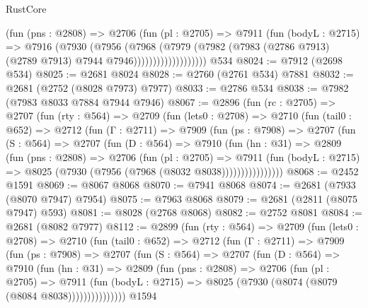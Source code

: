 \begin{lexlean}{RustCore}
\begin{coremodule}
                        (fun (pns : @2808) =>
                        @2706
                          (fun (pl : @2705) =>
                          @7911
                            (fun (bodyL : @2715) =>
                            @7916
                              (@7930
                                (@7956
                                  (@7968
                                    (@7979
                                      (@7982
                                        (@7983
                                          (@2786 @7913)
                                          (@2789 @7913)
                                          @7944
                                          @7946)))))))))))))))))))
    @534
@8024 := @7912 (@2698 @534)
@8025 := @2681 @8024
@8028 := @2760 (@2761 @534) @7881
@8032 := @2681 (@2752 (@8028 @7973) @7977)
@8033 := @2786 @534
@8038 := @7982 (@7983 @8033 @7884 @7944 @7946)
@8067 := @2896
    (fun (rc : @2705) =>
    @2707
      (fun (rty : @564) =>
      @2709
        (fun (lets0 : @2708) =>
        @2710
          (fun (tail0 : @652) =>
          @2712
            (fun (Γ : @2711) =>
            @7909
              (fun (ps : @7908) =>
              @2707
                (fun (S : @564) =>
                @2707
                  (fun (D : @564) =>
                  @7910
                    (fun (hn : @31) =>
                    @2809
                      (fun (pns : @2808) =>
                      @2706
                        (fun (pl : @2705) =>
                        @7911
                          (fun (bodyL : @2715) =>
                          @8025 (@7930 (@7956 (@7968 (@8032 @8038))))))))))))))))
@8068 := @2452 @1591
@8069 := @8067 @8068
@8070 := @7941 @8068
@8074 := @2681 (@7933 (@8070 @7947) @7954)
@8075 := @7963 @8068
@8079 := @2681 (@2811 (@8075 @7947) @593)
@8081 := @8028 (@2768 @8068)
@8082 := @2752 @8081
@8084 := @2681 (@8082 @7977)
@8112 := @2899
    (fun (rty : @564) =>
    @2709
      (fun (lets0 : @2708) =>
      @2710
        (fun (tail0 : @652) =>
        @2712
          (fun (Γ : @2711) =>
          @7909
            (fun (ps : @7908) =>
            @2707
              (fun (S : @564) =>
              @2707
                (fun (D : @564) =>
                @7910
                  (fun (hn : @31) =>
                  @2809
                    (fun (pns : @2808) =>
                    @2706
                      (fun (pl : @2705) =>
                      @7911
                        (fun (bodyL : @2715) =>
                        @8025 (@7930 (@8074 (@8079 (@8084 @8038)))))))))))))))
    @1594

\end{coremodule}
\end{lexlean}

